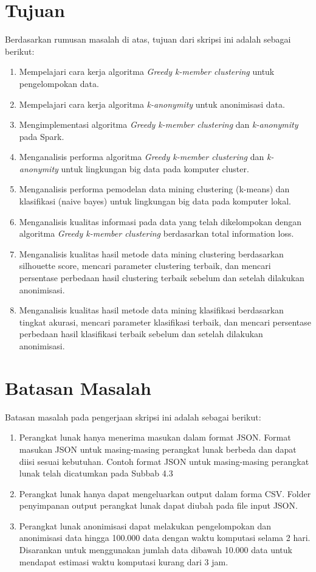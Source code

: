 \section{Tujuan}
\label{sec:tujuan}
Berdasarkan rumusan masalah di atas, tujuan dari skripsi ini adalah sebagai berikut:
\begin{enumerate}
\item Mempelajari cara kerja algoritma {\it Greedy k-member clustering} untuk pengelompokan data.
\item Mempelajari cara kerja algoritma {\it k-anonymity} untuk anonimisasi data.
\item Mengimplementasi algoritma {\it Greedy k-member clustering} dan {\it k-anonymity} pada Spark.
\item Menganalisis performa algoritma {\it Greedy k-member clustering} dan {\it k-anonymity} untuk lingkungan big data pada komputer cluster.
\item Menganalisis performa pemodelan data mining clustering (k-means) dan klasifikasi (naive bayes) untuk lingkungan big data pada komputer lokal.
\item Menganalisis kualitas informasi pada data yang telah dikelompokan dengan algoritma {\it Greedy k-member clustering} berdasarkan total information loss.
\item Menganalisis kualitas hasil metode data mining clustering berdasarkan silhouette score, mencari parameter clustering terbaik, dan mencari persentase perbedaan hasil clustering terbaik sebelum dan setelah dilakukan anonimisasi.
\item Menganalisis kualitas hasil metode data mining klasifikasi berdasarkan tingkat akurasi, mencari parameter klasifikasi terbaik, dan mencari persentase perbedaan hasil klasifikasi terbaik sebelum dan setelah dilakukan anonimisasi.
\end{enumerate}

\section{Batasan Masalah}
\label{sec:batasan}
Batasan masalah pada pengerjaan skripsi ini adalah sebagai berikut:
\begin{enumerate}

\item Perangkat lunak hanya menerima masukan dalam format JSON. Format masukan JSON untuk masing-masing perangkat lunak berbeda dan dapat diisi sesuai kebutuhan. Contoh format JSON untuk masing-masing perangkat lunak telah dicatumkan pada Subbab 4.3

\item Perangkat lunak hanya dapat mengeluarkan output dalam forma CSV. Folder penyimpanan output perangkat lunak dapat diubah pada file input JSON.

\item Perangkat lunak anonimisasi dapat melakukan pengelompokan dan anonimisasi data hingga 100.000 data dengan waktu komputasi selama 2 hari. Disarankan untuk menggunakan  jumlah data dibawah 10.000 data untuk mendapat estimasi waktu komputasi kurang dari 3 jam.


\end{enumerate}

